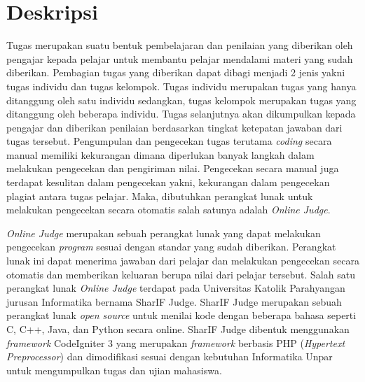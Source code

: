 \documentclass[a4paper,twoside]{article}
\begin{document}
\title{\@judultopik}
\author{\nama \textendash \@npm} 

\newcommand{\nama}{Filipus}
\newcommand{\@npm}{6181901074}
\newcommand{\@judultopik}{Konversi SharIF Judge dari CodeIgniter 3 ke CodeIgniter 4} %
\newcommand{\jumpemb}{1} %
\newcommand{\tanggal}{22/02/2023}


\maketitle


\section{Deskripsi}
Tugas merupakan suatu bentuk pembelajaran dan penilaian yang diberikan oleh pengajar kepada pelajar untuk membantu pelajar mendalami materi yang sudah diberikan. Pembagian tugas yang diberikan dapat dibagi menjadi 2 jenis yakni tugas individu dan tugas kelompok. Tugas individu merupakan tugas yang hanya ditanggung oleh satu individu sedangkan, tugas kelompok merupakan tugas yang ditanggung oleh beberapa individu. Tugas selanjutnya akan dikumpulkan kepada pengajar dan diberikan penilaian berdasarkan tingkat ketepatan jawaban dari tugas tersebut. Pengumpulan dan pengecekan tugas terutama \textit{coding} secara manual memiliki kekurangan dimana diperlukan banyak langkah dalam melakukan pengecekan dan pengiriman nilai. Pengecekan secara manual juga terdapat kesulitan dalam pengecekan yakni, kekurangan dalam pengecekan plagiat antara tugas pelajar. Maka, dibutuhkan perangkat lunak untuk melakukan pengecekan secara otomatis salah satunya adalah \textit{Online Judge}.

\textit{Online Judge} merupakan sebuah perangkat lunak yang dapat melakukan pengecekan \textit{program} sesuai dengan standar yang sudah diberikan. Perangkat lunak ini dapat menerima jawaban dari pelajar dan melakukan pengecekan secara otomatis dan memberikan keluaran berupa nilai dari pelajar tersebut. Salah satu perangkat lunak \textit{Online Judge} terdapat pada Universitas Katolik Parahyangan jurusan Informatika bernama SharIF Judge. SharIF Judge merupakan sebuah perangkat lunak \textit{open source} untuk menilai kode dengan beberapa bahasa seperti C, C++, Java, dan Python secara online. SharIF Judge dibentuk menggunakan \textit{framework} CodeIgniter 3 yang merupakan \textit{framework} berbasis PHP (\textit{Hypertext Preprocessor}) dan dimodifikasi sesuai dengan kebutuhan Informatika Unpar untuk mengumpulkan tugas dan ujian mahasiswa.
\end{document}
